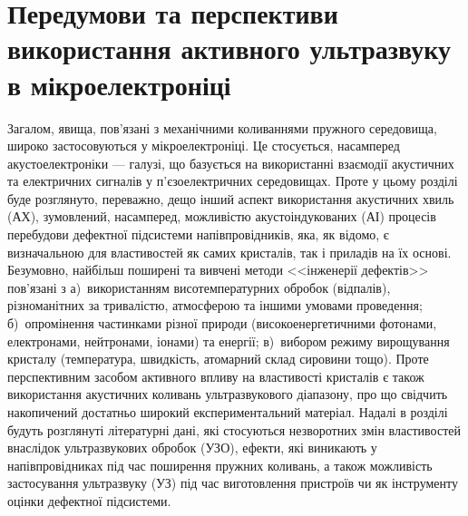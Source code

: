 \chapter{Передумови та перспективи використання активного ультразвуку в мікроелектроніці\label{Oglyad}}


Загалом, явища, пов'язані з механічними коливаннями пружного середовища, широко застосовуються у мікроелектроніці.
Це стосується, насамперед акустоелектроніки --- галузі, що базується на використанні взаємодії акустичних та електричних сигналів у п'єзоелектричних середовищах.
Проте у цьому розділі буде розглянуто, переважно, дещо інший аспект використання акустичних хвиль (АХ), 
зумовлений, насамперед, можливістю акустоіндукованих (АІ) процесів перебудови дефектної підсистеми напівпровідників, яка, як відомо, є визначальною для властивостей як самих кристалів, так і приладів на їх основі.
Безумовно, найбільш поширені та вивчені методи <<інженерії дефектів>> пов'язані з
а)~використанням висотемпературних обробок (відпалів), різноманітних за тривалістю, атмосферою та іншими умовами проведення;
б)~опромінення частинками різної природи (високоенергетичними фотонами, електронами, нейтронами, іонами) та енергії;
в)~вибором режиму вирощування кристалу (температура, швидкість, атомарний склад сировини тощо).
Проте перспективним засобом активного впливу на властивості кристалів є також використання акустичних коливань ультразвукового діапазону, про що свідчить накопичений достатньо широкий експериментальний матеріал.
Надалі в розділі будуть розглянуті літературні дані, які стосуються незворотних змін властивостей внаслідок ультразвукових обробок (УЗО), ефекти, які виникають у напівпровідниках під час поширення пружних коливань,
а також можливість застосування ультразвуку (УЗ) під час виготовлення пристроїв чи як інструменту оцінки дефектної підсистеми.

